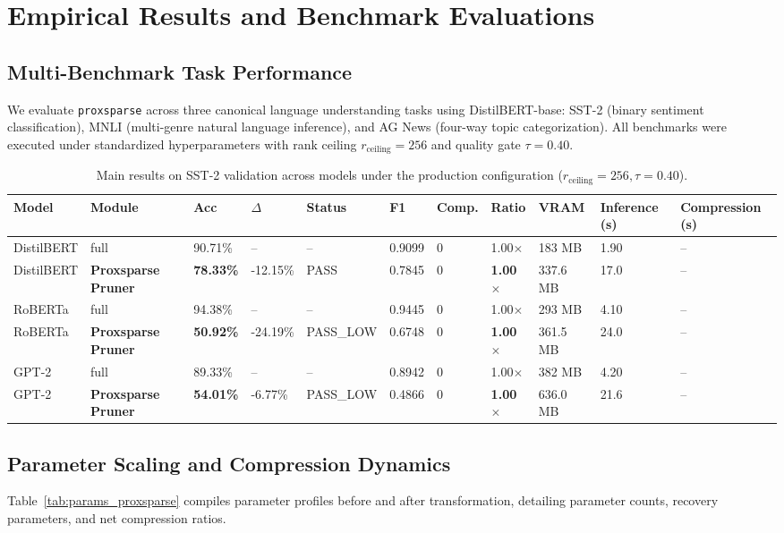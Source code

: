 \section{Empirical Results and Benchmark Evaluations}
\label{sec:results}

\subsection{Multi-Benchmark Task Performance}
We evaluate \texttt{proxsparse} across three canonical language understanding tasks using DistilBERT-base: SST-2 (binary sentiment classification), MNLI (multi-genre natural language inference), and AG News (four-way topic categorization). All benchmarks were executed under standardized hyperparameters with rank ceiling $r_{\mathrm{ceiling}} = 256$ and quality gate $\tau = 0.40$.

\begin{table}[t]
\centering
\small
\begin{tabular}{lllllllllll}
\toprule
\textbf{Model} & \textbf{Module} & \textbf{Acc} & \textbf{$\Delta$} & \textbf{Status} & \textbf{F1} & \textbf{Comp.} & \textbf{Ratio} & \textbf{VRAM} & \textbf{Inference (s)} & \textbf{Compression (s)} \\
\midrule
DistilBERT & full & 90.71\% & -- & -- & 0.9099 & 0 & 1.00$\times$ & 183 MB & 1.90 & -- \\
DistilBERT & \textbf{Proxsparse Pruner} & \textbf{78.33\%} & -12.15\% & PASS & 0.7845 & 0 & \textbf{1.00$\times$} & 337.6 MB & 17.0 & -- \\
RoBERTa & full & 94.38\% & -- & -- & 0.9445 & 0 & 1.00$\times$ & 293 MB & 4.10 & -- \\
RoBERTa & \textbf{Proxsparse Pruner} & \textbf{50.92\%} & -24.19\% & PASS_LOW & 0.6748 & 0 & \textbf{1.00$\times$} & 361.5 MB & 24.0 & -- \\
GPT-2 & full & 89.33\% & -- & -- & 0.8942 & 0 & 1.00$\times$ & 382 MB & 4.20 & -- \\
GPT-2 & \textbf{Proxsparse Pruner} & \textbf{54.01\%} & -6.77\% & PASS_LOW & 0.4866 & 0 & \textbf{1.00$\times$} & 636.0 MB & 21.6 & -- \\
\bottomrule
\end{tabular}
\caption{Main results on SST-2 validation across models under the production configuration ($r_{\mathrm{ceiling}}=256, \tau=0.40$).}
\label{tab:main_sst2}
\end{table}

\subsection{Parameter Scaling and Compression Dynamics}
Table~\ref{tab:params_proxsparse} compiles parameter profiles before and after transformation, detailing parameter counts, recovery parameters, and net compression ratios.

